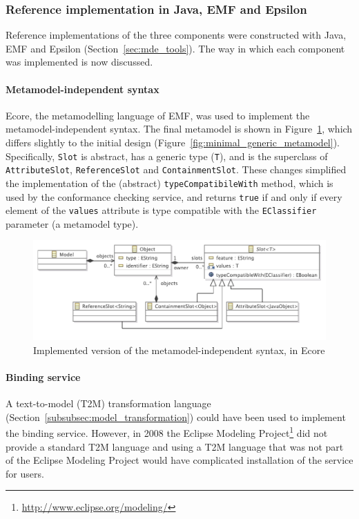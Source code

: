 \subsubsection{Reference implementation in Java, EMF and Epsilon}
\label{subsubsec:mmi_impl}
Reference implementations of the three components were constructed with Java, EMF and Epsilon (Section~\ref{sec:mde_tools}). The way in which each component was implemented is now discussed.

\paragraph{Metamodel-independent syntax} Ecore, the metamodelling language of EMF, was used to implement the metamodel-independent syntax. The final metamodel is shown in Figure~\ref{fig:mmi_syntax_impl}, which differs slightly to the initial design (Figure~\ref{fig:minimal_generic_metamodel}). Specifically, \texttt{Sl\-ot} is abstract, has a generic type (\texttt{T}), and is the superclass of \texttt{Att\-ri\-bu\-teSl\-ot}, \texttt{Re\-fe\-re\-n\-ceSl\-ot} and \texttt{Co\-nt\-ai\-nm\-entSl\-ot}. These changes simplified the implementation of the (abstract) \texttt{ty\-peCo\-mp\-at\-ib\-i\-leWi\-th} method, which is used by the conformance checking service, and returns \texttt{true} if and only if every element of the \texttt{va\-lu\-es} attribute is type compatible with the \texttt{EC\-la\-ss\-if\-ier} parameter (a metamodel type).  

\begin{figure}[htbp]
  \centering
  \includegraphics[width=12cm]{5.Implementation/images/slot_model_complete.pdf}
  \caption{Implemented version of the metamodel-independent syntax, in Ecore}
  \label{fig:mmi_syntax_impl}
\end{figure}

\paragraph{Binding service} A text-to-model (T2M) transformation language (Section~\ref{subsubsec:model_transformation}) could have been used to implement the binding service. However, in 2008 the Eclipse Modeling Project\footnote{\url{http://www.eclipse.org/modeling/}} did not provide a standard T2M language and using a T2M language that was not part of the Eclipse Modeling Project would have complicated installation of the service for users.

